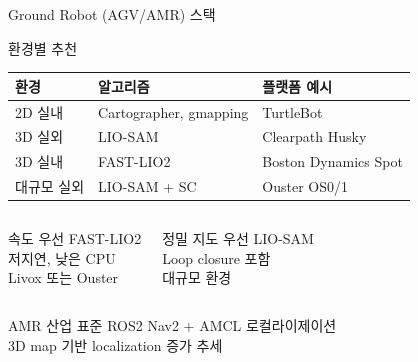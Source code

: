 \begin{frame}{Ground Robot (AGV/AMR) 스택}
  \begin{block}{환경별 추천}
    \begin{center}
      \begin{tabular}{lll}
        \hline
        \textbf{환경} & \textbf{알고리즘} & \textbf{플랫폼 예시} \\
        \hline
        2D 실내 & Cartographer, gmapping & TurtleBot \\
        3D 실외 & LIO-SAM & Clearpath Husky \\
        3D 실내 & FAST-LIO2 & Boston Dynamics Spot \\
        대규모 실외 & LIO-SAM + SC & Ouster OS0/1 \\
        \hline
      \end{tabular}
    \end{center}
  \end{block}
  \pause
  \begin{columns}
    \begin{block}{속도 우선}
      FAST-LIO2\\
      저지연, 낮은 CPU\\
      Livox 또는 Ouster
    \end{block}
    \begin{block}{정밀 지도 우선}
      LIO-SAM\\
      Loop closure 포함\\
      대규모 환경
    \end{block}
  \end{columns}
  \pause
  \begin{exampleblock}{AMR 산업 표준}
    ROS2 Nav2 + AMCL 로컬라이제이션\\
    3D map 기반 localization 증가 추세
  \end{exampleblock}
\end{frame}


